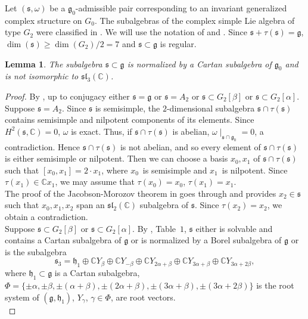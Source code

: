 \documentclass[10pt]{article}
\newtheorem{lemma}[theorem]{Lemma}
\begin{document}
Let $(\mathfrak{s},\omega)$ be a $\mathfrak{g}_0$-admissible pair corresponding to an invariant generalized complex structure on $G_0$. The subalgebras of the complex simple Lie algebra of type $G_2$ were classified in \cite{Mayanskiy}. We will use the notation of \cite{Dynkin} and \cite{Mayanskiy}. Since $\mathfrak{s}+\tau (\mathfrak{s})=\mathfrak{g}$, $\operatorname{dim} (\mathfrak{s})\geq \operatorname{dim}(G_2)/2=7$ and $\mathfrak{s}\subset \mathfrak{g}$ is regular.

\begin{lemma}\label{lemma:L}
The subalgebra $\mathfrak{s}\subset \mathfrak{g}$ is normalized by a Cartan subalgebra of $\mathfrak{g}_0$ and is not isomorphic to $\mathfrak{sl}_3(\mathbb C)$.
\end{lemma}

\begin{proof}

By \cite{Dynkin}, up to conjugacy either $\mathfrak{s}=\mathfrak{g}$ or $\mathfrak{s}=A_2$ or $\mathfrak{s}\subset G_2[\beta]$ or $\mathfrak{s}\subset G_2[\alpha]$.\\

Suppose $\mathfrak{s}=A_2$. Since $\mathfrak{s}$ is semisimple, the $2$-dimensional subalgebra $\mathfrak{s} \cap \tau (\mathfrak{s})$ contains semisimple and nilpotent components of its elements. Since $H^2(\mathfrak{s},\mathbb C )=0$, $\omega$ is exact. Thus, if $\mathfrak{s} \cap \tau (\mathfrak{s})$ is abelian, $\omega \mid_{\mathfrak{s}\cap \mathfrak{g}_0}=0$, a contradiction. Hence $\mathfrak{s} \cap \tau (\mathfrak{s})$ is not abelian, and so every element of $\mathfrak{s} \cap \tau (\mathfrak{s})$ is either semisimple or nilpotent. Then we can choose a basis $x_0, x_1$ of $\mathfrak{s} \cap \tau (\mathfrak{s})$ such that $[x_0,x_1]=2\cdot x_1$, where $x_0$~is semisimple and $x_1$~is nilpotent. Since $\tau (x_1)\in \mathbb C x_1$, we may assume that $\tau (x_0)=x_0$, $\tau (x_1)=x_1$.\\

The proof of the Jacobson-Morozov theorem in \cite{Orbits} goes through and provides $x_2\in \mathfrak{s}$ such that $x_0,x_1,x_2$ span an $\mathfrak{sl}_2(\mathbb C)$ subalgebra of $\mathfrak{s}$. Since $\tau (x_2)=x_2$, we obtain a contradiction.\\

Suppose $\mathfrak{s}\subset G_2[\beta]$ or $\mathfrak{s}\subset G_2[\alpha]$. By \cite{Mayanskiy}, Table~$1$, $\mathfrak{s}$ either is solvable and contains a Cartan subalgebra of $\mathfrak{g}$ or is normalized by a Borel subalgebra of $\mathfrak{g}$ or is the subalgebra
$$
\mathfrak{s}_3 = \mathfrak{h}_1\oplus \mathbb C Y_{\beta}\oplus \mathbb C Y_{-\beta}\oplus \mathbb C Y_{2\alpha +\beta}\oplus \mathbb C Y_{3\alpha +\beta}\oplus \mathbb C Y_{3\alpha +2\beta},
$$
where $\mathfrak{h}_1\subset \mathfrak{g}$ is a Cartan subalgebra, $\Phi = \{ \pm \alpha , \pm \beta , \pm (\alpha +\beta ) , \pm (2\alpha +\beta ) , \pm (3\alpha +\beta ) , \pm (3\alpha +2\beta ) \}$ is the root system of $(\mathfrak{g} , \mathfrak{h}_1)$, $Y_{\gamma}$, $\gamma\in \Phi$, are root vectors.\\ 


\end{proof}
\end{document}
